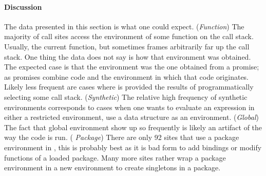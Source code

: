 \documentclass[review,screen,acmsmall,anonymous=true]{acmart}
\begin{document}
\paragraph{Discussion}
The data presented in this section is what one could expect. ({\it Function})
The majority of \eval call sites access the environment of some function on the
call stack. Usually, the current function, but sometimes frames arbitrarily far
up the call stack. One thing the data does not say is how that environment was
obtained. The expected case is that the environment was the one obtained from a
promise; as promises combine code and the environment in which that code
originates. Likely less frequent are cases where \eval is provided the results
of programmatically selecting some call stack. ({\it Synthetic}) The relative
high frequency of synthetic environments corresponds to cases when one wants to
evaluate an expression in either a restricted environment, use a data
structure as an environment. ({\it Global}) The fact that global environment
show up so frequently is likely an artifact of the way the code is run. ({\it
  Package}) There are only 92 sites that use a package environment in \eval,
this is probably best as it is bad form to add bindings or modify functions
of a loaded package. Many more sites rather wrap a package environment in a new
environment to create singletons in a package.


\end{document}
